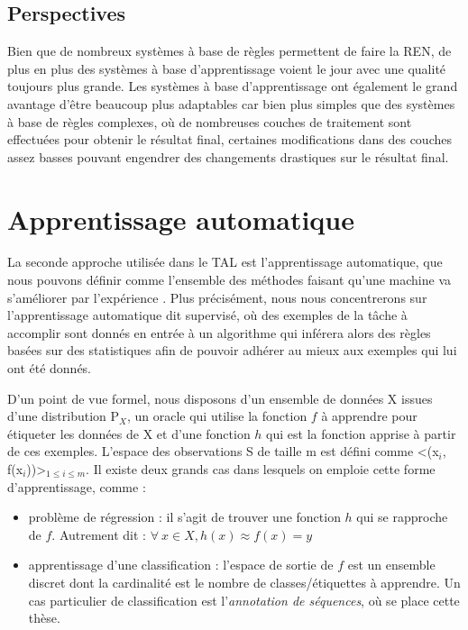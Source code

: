 \documentclass[12pt,a4paper,times,twoside,openright]{report}
\begin{document}
        
        \subsection{Perspectives}
Bien que de nombreux systèmes à base de règles permettent de faire la REN, de plus en plus des systèmes à base d'apprentissage voient le jour avec une qualité toujours plus grande. Les systèmes à base d'apprentissage ont également le grand avantage d'être beaucoup plus adaptables car bien plus simples que des systèmes à base de règles complexes, où de nombreuses couches de traitement sont effectuées pour obtenir le résultat final, certaines modifications dans des couches assez basses pouvant engendrer des changements drastiques sur le résultat final.


    
    \section{Apprentissage automatique}
    \label{sec:machine-learning}
La seconde approche utilisée dans le TAL est l'apprentissage automatique, que nous pouvons définir comme l'ensemble des méthodes faisant qu'une machine va s'améliorer par l'expérience \citep{cornuejols2011apprentissage}. Plus précisément, nous nous concentrerons sur l'apprentissage automatique dit supervisé, où des exemples de la tâche à accomplir sont donnés en entrée à un algorithme qui inférera alors des règles basées sur des statistiques afin de pouvoir adhérer au mieux aux exemples qui lui ont été donnés.

D'un point de vue formel, nous disposons d'un ensemble de données X issues d'une distribution P$_{X}$, un oracle qui utilise la fonction $f$ à apprendre pour étiqueter les données de X et d'une fonction $h$ qui est la fonction apprise à partir de ces exemples. L'espace des observations S de taille m est défini comme <(x$_{i}$, f(x$_{i}$))>$_{1\leq i \leq m}$. Il existe deux grands cas dans lesquels on emploie cette forme d'apprentissage, comme :
\begin{itemize}
    \item problème de régression : il s'agit de trouver une fonction $h$ qui se rapproche de $f$. Autrement dit : $\forall\ x \in X, h(x) \approx f(x) = y$
    \item apprentissage d'une classification : l'espace de sortie de $f$ est un ensemble discret dont la cardinalité est le nombre de classes/étiquettes à apprendre. Un cas particulier de classification est l'\emph{annotation de séquences}, où se place cette thèse.
\end{itemize}
\end{document}
